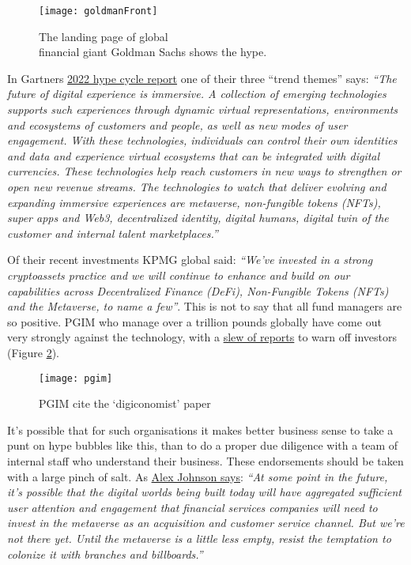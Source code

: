 \documentclass[
	12pt, %
	fleqn, %
	a4paper, %
	oneside, %
]{LegrandOrangeBook}
\begin{document}
\begin{figure}[ht]\centering %
	\texttt{[image: goldmanFront]}
	\caption{The landing page of global\\financial giant Goldman Sachs shows the hype.}
	\label{fig:goldmanFront}
\end{figure}
In Gartners \href{https://www.itp.net/emergent-tech/gartner-says-nfts-metaverse-web3-will-expand-immersive-experiences}{2022 hype cycle report} one of their three ``trend themes'' says: \textit{``The future of digital experience is immersive. A collection of emerging technologies supports such experiences through dynamic virtual representations, environments and ecosystems of customers and people, as well as new modes of user engagement. With these technologies, individuals can control their own identities and data and experience virtual ecosystems that can be integrated with digital currencies. These technologies help reach customers in new ways to strengthen or open new revenue streams.
The technologies to watch that deliver evolving and expanding immersive experiences are metaverse, non-fungible tokens (NFTs), super apps and Web3, decentralized identity, digital humans, digital twin of the customer and internal talent marketplaces.''}\par
Of their recent investments KPMG global said: \textit{``We've invested in a strong cryptoassets practice and we will continue to enhance and build on our capabilities across Decentralized Finance (DeFi), Non-Fungible Tokens (NFTs) and the Metaverse, to name a few''}. This is not to say that all fund managers are so positive. PGIM who manage over a trillion pounds globally have come out very strongly against the technology, with a \href{https://www.pgim.com/megatrends/cryptocurrency-investing/bitcoin?}{slew of reports} to warn off investors (Figure \ref{fig:pgim}).\par
\begin{figure}[ht]\centering 	\texttt{[image: pgim]}
	\caption{PGIM cite the `digiconomist' paper}
	\label{fig:pgim}
\end{figure}
It's possible that for such organisations it makes better business sense to take a punt on hype bubbles like this, than to do a proper due diligence with a team of internal staff who understand their business. These endorsements should be taken with a large pinch of salt. As \href{https://newsletter.fintechtakes.com/p/metaverse-branches?s=r}{Alex Johnson says}: \textit{``At some point in the future, it’s possible that the digital worlds being built today will have aggregated sufficient user attention and engagement that financial services companies will need to invest in the metaverse as an acquisition and customer service channel. But we’re not there yet. Until the metaverse is a little less empty, resist the temptation to colonize it with branches and billboards.''}\par
\end{document}
